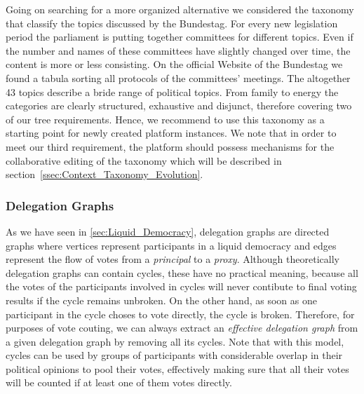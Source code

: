 Going on searching for a more organized alternative we considered the taxonomy that classify the topics discussed by the Bundestag.
For every new legislation period the parliament is putting together committees for different topics.
Even if the number and names of these committees have slightly changed over time, the content is more or less consisting.
On the official Website of the Bundestag we found a tabula sorting all protocols of the committees' meetings.
The altogether 43 topics describe a bride range of political topics.
From family to energy the categories are clearly structured, exhaustive and disjunct, therefore covering two of our tree requirements.
Hence, we recommend to use this taxonomy as a starting point for newly created  platform instances.
We note that in order to meet our third requirement, the platform should possess mechanisms for the collaborative editing of the taxonomy which will be described in section~\ref{ssec:Context_Taxonomy_Evolution}.

\subsubsection{Delegation Graphs}

As we have seen in \ref{sec:Liquid_Democracy}, delegation graphs are directed graphs where vertices represent participants in a liquid democracy and edges represent the flow of votes from a \textit{principal} to a \textit{proxy}.
Although theoretically delegation graphs can contain cycles, these have no practical meaning, because all the votes of the participants involved in cycles will never contibute to final voting results if the cycle remains unbroken.
On the other hand, as soon as one participant in the cycle choses to vote directly, the cycle is broken.
Therefore, for purposes of vote couting, we can always extract an \emph{effective delegation graph} from a given delegation graph by removing all its cycles.
Note that with this model, cycles can be used by groups of participants with considerable overlap in their political opinions to pool their votes, effectively making sure that all their votes will be counted if at least one of them votes directly.

